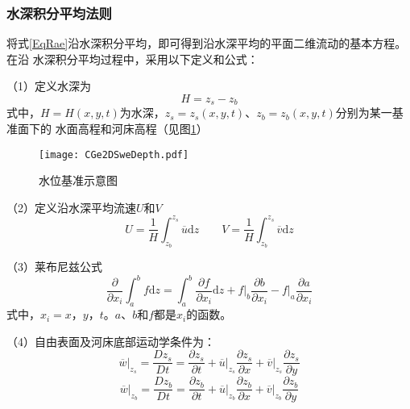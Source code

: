 \subsubsection{水深积分平均法则}
将式\eqref{EqRae}沿水深积分平均，即可得到沿水深平均的平面二维流动的基本方程。在沿
水深积分平均过程中，采用以下定义和公式：

（1）定义水深为
\begin{equation}
  H =  z_{s} - z_{b}
\end{equation}
式中，$H=H(x,y,t)$为水深，$ z_{s}= z_{s}(x,y,t)$、$z_{b}=z_{b}(x,y,t)$分别为某一基准面下的
水面高程和河床高程（见图\ref{FgCGe_2DSwe_depth}）

\begin{figure}[hb]
  \centering
  \texttt{[image: CGe2DSweDepth.pdf]}
  \caption{水位基准示意图}
  \label{FgCGe_2DSwe_depth}
\end{figure}

（2）定义沿水深平均流速$U$和$V$
\begin{equation}
  U
  =
  \frac{1}{H}
  \int_{z_{b}}^{ z_{s}}\!\overline{u}\mathrm{d}z
  \quad
  \quad
  V
  =
  \frac{1}{H}
  \int_{z_{b}}^{ z_{s}}\!\overline{v}\mathrm{d}z
\end{equation}

（3）莱布尼兹公式
\begin{equation}
  \frac{\partial}{\partial x_{i}}
  \int_{a}^{b}\!f\mathrm{d}z
  =
  \int_{a}^{b}\!
  \frac{\partial f}{\partial x_{i}}\mathrm{d}z
  +
  \left.
  f
  \right|_{b}\frac{\partial b}{\partial x_{i}}
  -
  \left.f\right|_{a}\frac{\partial a}{\partial x_{i}}
  \label{EqCGeLeibnizLaw}
\end{equation}
式中，$x_{i}=x$，$y$，$t$。$a$、$b$和$f$都是$x_{i}$的函数。

（4）自由表面及河床底部运动学条件为：
\begin{equation}
  \left.\overline{w}\right|_{z_{s}}
  =
  \frac{D z_{s}}{Dt}
  =
  \frac{\partial z_{s}}{\partial t}
  +
  \left.\overline{u}\right|_{z_{s}}\frac{\partial z_{s}}{\partial x}
  +
  \left.\overline{v}\right|_{z_{s}}\frac{\partial z_{s}}{\partial y}
  \label{EqCGeSMC}
\end{equation}
\begin{equation}
  \left.\overline{w}\right|_{z_{b}}
  =
  \frac{Dz_{b}}{Dt}
  =
  \frac{\partial z_{b}}{\partial t}
  +
  \left.\overline{u}\right|_{z_{b}}\frac{\partial z_{b}}{\partial x}
  +
  \left.\overline{v}\right|_{z_{b}}\frac{\partial z_{b}}{\partial y}
  \label{EqCGeBMC}
\end{equation}

